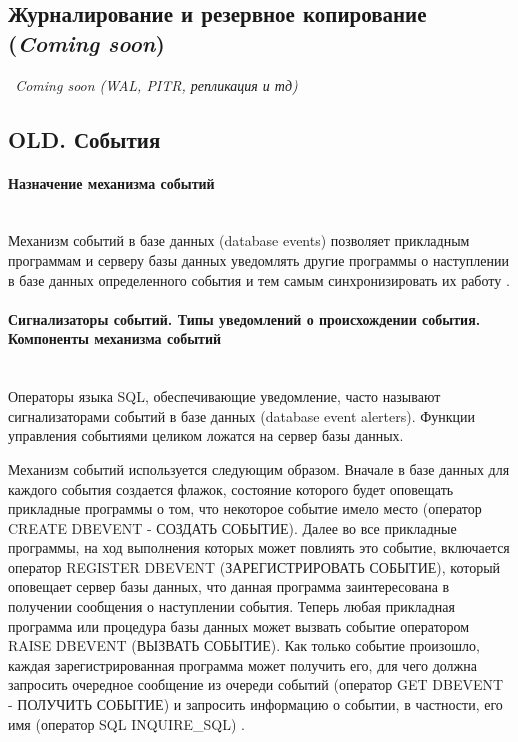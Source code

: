 \subsection{Журналирование и резервное копирование (\textit{Coming soon})}

\textit{~Coming soon (WAL, PITR, репликация и тд)}



























\subsection{OLD. События}

\paragraph{Назначение механизма событий} ~\\

Механизм событий в базе данных (database events) позволяет прикладным программам и серверу базы данных уведомлять другие программы о наступлении в базе данных определенного события и тем самым синхронизировать их работу \autocite{OSP}.

\paragraph{Сигнализаторы событий. Типы уведомлений о происхождении события. Компоненты механизма событий} ~\\

Операторы языка SQL, обеспечивающие уведомление, часто называют сигнализаторами событий в базе данных (database event alerters). Функции управления событиями целиком ложатся на сервер базы данных.


Механизм событий используется следующим образом. Вначале в базе данных для каждого события создается флажок, состояние которого будет оповещать прикладные программы о том, что некоторое событие имело место (оператор CREATE DBEVENT - СОЗДАТЬ СОБЫТИЕ). Далее во все прикладные программы, на ход выполнения которых может повлиять это событие, включается оператор REGISTER DBEVENT (ЗАРЕГИСТРИРОВАТЬ СОБЫТИЕ), который оповещает сервер базы данных, что данная программа заинтересована в получении сообщения о наступлении события. Теперь любая прикладная программа или процедура базы данных может вызвать событие оператором RAISE DBEVENT (ВЫЗВАТЬ СОБЫТИЕ). Как только событие произошло, каждая зарегистрированная программа может получить его, для чего должна запросить очередное сообщение из очереди событий (оператор GET DBEVENT - ПОЛУЧИТЬ СОБЫТИЕ) и запросить информацию о событии, в частности, его имя (оператор SQL INQUIRE\_SQL) \autocite{OSP}.

